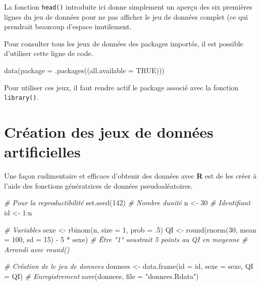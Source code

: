 \documentclass[
]{book}
\newenvironment{Shaded}{}{}
\newcommand{\AttributeTok}[1]{#1}
\newcommand{\CommentTok}[1]{\textit{#1}}
\newcommand{\ConstantTok}[1]{#1}
\newcommand{\DecValTok}[1]{#1}
\newcommand{\FunctionTok}[1]{#1}
\newcommand{\NormalTok}[1]{#1}
\newcommand{\OtherTok}[1]{#1}
\newcommand{\SpecialCharTok}[1]{#1}
\newcommand{\StringTok}[1]{#1}
\begin{document}
La fonction \texttt{head()} introduite ici donne simplement un aperçu des six premières lignes du jeu de données pour ne pas afficher le jeu de données complet (ce qui prendrait beaucoup d'espace inutilement.

Pour consulter tous les jeux de données des packages importés, il est possible d'utiliser cette ligne de code.

\begin{Shaded}
\begin{Highlighting}[]
\FunctionTok{data}\NormalTok{(}\AttributeTok{package =} \FunctionTok{.packages}\NormalTok{((}\AttributeTok{all.available =} \ConstantTok{TRUE}\NormalTok{)))}
\end{Highlighting}
\end{Shaded}

Pour utiliser ces jeux, il faut rendre actif le package associé avec la fonction \texttt{library()}.

\hypertarget{cruxe9ation-des-jeux-de-donnuxe9es-artificielles}{%
\section{Création des jeux de données artificielles}\label{cruxe9ation-des-jeux-de-donnuxe9es-artificielles}}

Une façon rudimentaire et efficace d'obtenir des données avec \textbf{R} est de les créer à l'aide des fonctions génératrices de données pseudoaléatoires.

\begin{Shaded}
\begin{Highlighting}[]
\CommentTok{\# Pour la reproductibilité}
\FunctionTok{set.seed}\NormalTok{(}\DecValTok{142}\NormalTok{)}
\CommentTok{\# Nombre d\textquotesingle{}unité}
\NormalTok{n }\OtherTok{\textless{}{-}} \DecValTok{30}
\CommentTok{\# Identifiant}
\NormalTok{id }\OtherTok{\textless{}{-}} \DecValTok{1}\SpecialCharTok{:}\NormalTok{n}

\CommentTok{\# Variables}
\NormalTok{sexe }\OtherTok{\textless{}{-}} \FunctionTok{rbinom}\NormalTok{(n, }\AttributeTok{size =} \DecValTok{1}\NormalTok{, }\AttributeTok{prob =}\NormalTok{ .}\DecValTok{5}\NormalTok{)}
\NormalTok{QI }\OtherTok{\textless{}{-}}  \FunctionTok{round}\NormalTok{(}\FunctionTok{rnorm}\NormalTok{(}\DecValTok{30}\NormalTok{, }\AttributeTok{mean =} \DecValTok{100}\NormalTok{, }\AttributeTok{sd =} \DecValTok{15}\NormalTok{) }\SpecialCharTok{{-}} \DecValTok{5} \SpecialCharTok{*}\NormalTok{ sexe)}
\CommentTok{\# Être "1" soustrait  5 points au QI en moyenne}
\CommentTok{\# Arrondi avec round()}

\CommentTok{\# Création de le jeu de donnees}
\NormalTok{donnees }\OtherTok{\textless{}{-}}  \FunctionTok{data.frame}\NormalTok{(}\AttributeTok{id =}\NormalTok{ id, }\AttributeTok{sexe =}\NormalTok{ sexe, }\AttributeTok{QI =}\NormalTok{ QI)}
\CommentTok{\# Enregistrement}
\FunctionTok{save}\NormalTok{(donnees, }\AttributeTok{file =} \StringTok{"donnees.Rdata"}\NormalTok{)}
\end{Highlighting}
\end{Shaded}
\end{document}
